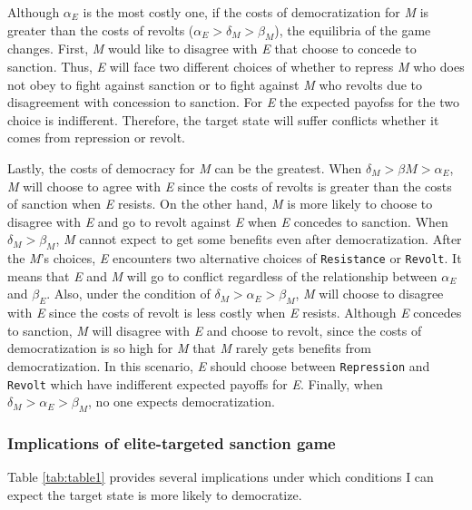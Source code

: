\documentclass[11pt]{article}
\begin{document}
Although $\alpha_{E}$ is the most costly one, if the costs of democratization for \textit{M} is greater than the costs of revolts ($\alpha_{E} > \delta_{M} > \beta_{M}$), the equilibria of the game changes. First, \textit{M} would like to disagree with \textit{E} that choose to concede to sanction. Thus, \textit{E} will face two different choices of whether to repress \textit{M} who does not obey to fight against sanction or to fight against \textit{M} who revolts due to disagreement with concession to sanction. For \textit{E} the expected payofss for the two choice is indifferent. Therefore, the target state will suffer conflicts whether it comes from repression or revolt.

Lastly, the costs of democracy for \textit{M} can be the greatest. When $\delta_{M} > \beta{M} > \alpha_{E}$, \textit{M} will choose to agree with \textit{E} since the costs of revolts is greater than the costs of sanction when \textit{E} resists. On the other hand, \textit{M} is more likely to choose to disagree with \textit{E} and go to revolt against \textit{E} when \textit{E} concedes to sanction. When $\delta_{M} > \beta_{M}$, \textit{M} cannot expect to get some benefits even after democratization. After the \textit{M}'s choices, \textit{E} encounters two alternative choices of \texttt{Resistance} or \texttt{Revolt}. It means that \textit{E} and \textit{M} will go to conflict regardless of the relationship between $\alpha_{E}$ and $\beta_{E}$. Also, under the condition of $\delta_{M} > \alpha_{E} > \beta_{M}$, \textit{M} will choose to disagree with \textit{E} since the costs of revolt is less costly when \textit{E} resists. Although \textit{E} concedes to sanction, \textit{M} will disagree with \textit{E} and choose to revolt, since the costs of democratization is so high for \textit{M} that \textit{M} rarely gets benefits from democratization. In this scenario, \textit{E} should choose between \texttt{Repression} and \texttt{Revolt} which have indifferent expected payoffs for \textit{E}. Finally, when $\delta_{M} > \alpha_{E} > \beta_{M}$, no one expects democratization.

	
\subsubsection*{Implications of elite-targeted sanction game}

Table \ref{tab:table1} provides several implications under which conditions I can expect the target state is more likely to democratize. 
\end{document}
